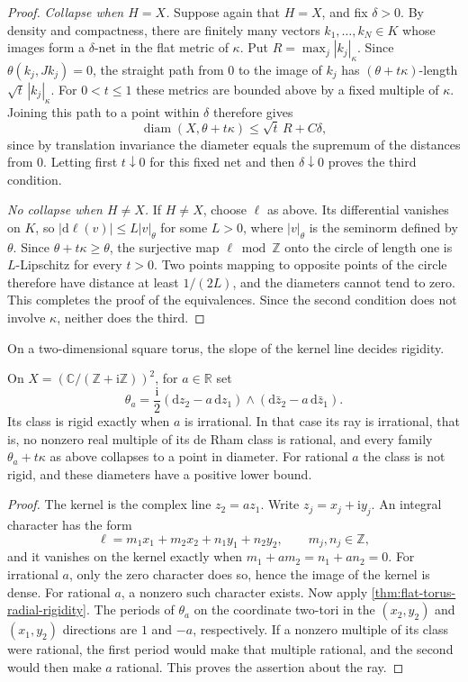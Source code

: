 \begin{proof}
\emph{Collapse when $H=X$.} Suppose again that $H=X$, and fix $\delta>0$. By density and compactness, there are finitely many vectors $k_1,\ldots,k_N\in K$ whose images form a $\delta$-net in the flat metric of $\kappa$. Put $R=\max_j|k_j|_\kappa$. Since $\theta(k_j,Jk_j)=0$, the straight path from $0$ to the image of $k_j$ has $(\theta+t\kappa)$-length $\sqrt t\,|k_j|_\kappa$. For $0<t\leq1$ these metrics are bounded above by a fixed multiple of $\kappa$. Joining this path to a point within $\delta$ therefore gives
\[
 \operatorname{diam}(X,\theta+t\kappa)
       \leq\sqrt t\,R+C\delta,
\]
since by translation invariance the diameter equals the supremum of the distances from $0$. Letting first $t\downarrow0$ for this fixed net and then $\delta\downarrow0$ proves the third condition.

\emph{No collapse when $H\ne X$.} If $H\ne X$, choose $\ell$ as above. Its differential vanishes on $K$, so $|\mathrm d\ell(v)|\leq L|v|_\theta$ for some $L>0$, where $|v|_\theta$ is the seminorm defined by $\theta$. Since $\theta+t\kappa\geq\theta$, the surjective map $\ell\bmod\mathbb Z$ onto the circle of length one is $L$-Lipschitz for every $t>0$. Two points mapping to opposite points of the circle therefore have distance at least $1/(2L)$, and the diameters cannot tend to zero. This completes the proof of the equivalences. Since the second condition does not involve $\kappa$, neither does the third.
\end{proof}

On a two-dimensional square torus, the slope of the kernel line decides rigidity.

\begin{example}\label{ex:irrational-torus-rigidity}
On $X=(\mathbb C/(\mathbb Z+\mathrm i\mathbb Z))^2$, for $a\in\mathbb R$ set
\[
 \theta_a=\frac{\mathrm i}{2}
       (\mathrm dz_2-a\,\mathrm dz_1)
       \wedge(\mathrm d\bar z_2-a\,\mathrm d\bar z_1).
\]
Its class is rigid exactly when $a$ is irrational. In that case its ray is irrational, that is, no nonzero real multiple of its de Rham class is rational, and every family $\theta_a+t\kappa$ as above collapses to a point in diameter. For rational $a$ the class is not rigid, and these diameters have a positive lower bound.
\end{example}
\begin{proof}
The kernel is the complex line $z_2=a z_1$. Write $z_j=x_j+\mathrm i y_j$. An integral character has the form
\[
 \ell=m_1x_1+m_2x_2+n_1y_1+n_2y_2,
 \qquad m_j,n_j\in\mathbb Z,
\]
and it vanishes on the kernel exactly when $m_1+a m_2=n_1+a n_2=0$. For irrational $a$, only the zero character does so, hence the image of the kernel is dense. For rational $a$, a nonzero such character exists. Now apply \cref{thm:flat-torus-radial-rigidity}. The periods of $\theta_a$ on the coordinate two-tori in the $(x_2,y_2)$ and $(x_1,y_2)$ directions are $1$ and $-a$, respectively. If a nonzero multiple of its class were rational, the first period would make that multiple rational, and the second would then make $a$ rational. This proves the assertion about the ray.
\end{proof}

